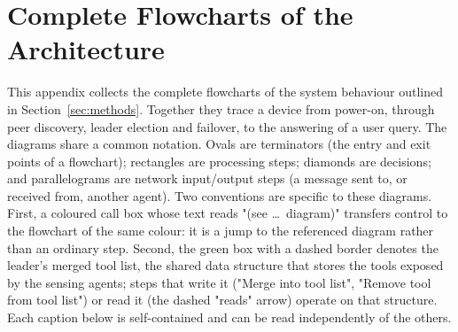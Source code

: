 %


\section{Complete Flowcharts of the Architecture}
\label{app:flowcharts}

This appendix collects the complete flowcharts of the system behaviour outlined in Section~\ref{sec:methods}. Together they trace a device from power-on, through peer discovery, leader election and failover, to the answering of a user query. The diagrams share a common notation. Ovals are terminators (the entry and exit points of a flowchart); rectangles are processing steps; diamonds are decisions; and parallelograms are network input/output steps (a message sent to, or received from, another agent). Two conventions are specific to these diagrams. First, a coloured call box whose text reads "(see \dots\ diagram)" transfers control to the flowchart of the same colour: it is a jump to the referenced diagram rather than an ordinary step. Second, the green box with a dashed border denotes the leader's merged tool list, the shared data structure that stores the tools exposed by the sensing agents; steps that write it ("Merge into tool list", "Remove tool from tool list") or read it (the dashed "reads" arrow) operate on that structure. Each caption below is self-contained and can be read independently of the others.


